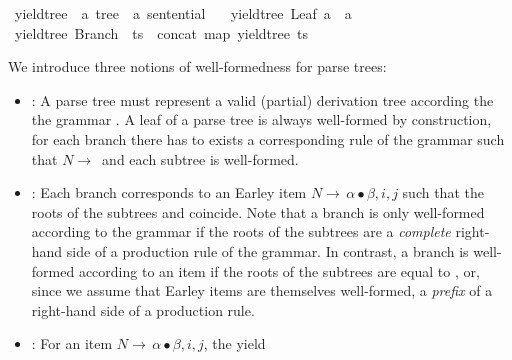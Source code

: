 \begin{isabellebody}
\isanewline
{}\isamarkupfalse%
\ yield{\isacharunderscore}{\kern0pt}tree\ {\isacharcolon}{\kern0pt}{\isacharcolon}{\kern0pt}\ {\isachardoublequoteopen}{\isacharprime}{\kern0pt}a\ tree\ {\isasymRightarrow}\ {\isacharprime}{\kern0pt}a\ sentential{\isachardoublequoteclose}\ \isanewline
\ \ {\isachardoublequoteopen}yield{\isacharunderscore}{\kern0pt}tree\ {\isacharparenleft}{\kern0pt}Leaf\ a{\isacharparenright}{\kern0pt}\ {\isacharequal}{\kern0pt}\ {\isacharbrackleft}{\kern0pt}a{\isacharbrackright}{\kern0pt}{\isachardoublequoteclose}\isanewline
{\isacharbar}{\kern0pt}\ {\isachardoublequoteopen}yield{\isacharunderscore}{\kern0pt}tree\ {\isacharparenleft}{\kern0pt}Branch\ {\isacharunderscore}{\kern0pt}\ ts{\isacharparenright}{\kern0pt}\ {\isacharequal}{\kern0pt}\ concat\ {\isacharparenleft}{\kern0pt}map\ yield{\isacharunderscore}{\kern0pt}tree\ ts{\isacharparenright}{\kern0pt}{\isachardoublequoteclose}%
\begin{isamarkuptext}%
We introduce three notions of well-formedness for parse trees:
\begin{itemize}
  \item {}: A parse tree must represent a valid (partial) derivation tree according the the grammar \isa{{\isasymG}}.
    A leaf of a parse tree is always well-formed by construction, for each branch 
    there has to exists a corresponding rule of the grammar \isa{{\isasymG}} such that $N \rightarrow \, $
     and each subtree  is well-formed.
  \item {}: Each branch  corresponds to an Earley item
    $N \rightarrow \, \alpha \bullet \beta, i, j$ such that the roots of the subtrees  and
    \isa{{\isasymalpha}} coincide. Note that a branch is only well-formed according to the grammar if
    the roots of the subtrees are a \textit{complete} right-hand side of a production rule of the grammar.
    In contrast, a branch is well-formed according to an item if the roots of the subtrees are equal
    to \isa{{\isasymalpha}}, or, since we assume that Earley items are themselves well-formed, a \textit{prefix}
    of a right-hand side of a production rule.
  \item {}: For an item $N \rightarrow \, \alpha \bullet \beta, i, j$, the yield

\end{itemize}
\end{isamarkuptext}
\end{isabellebody}
